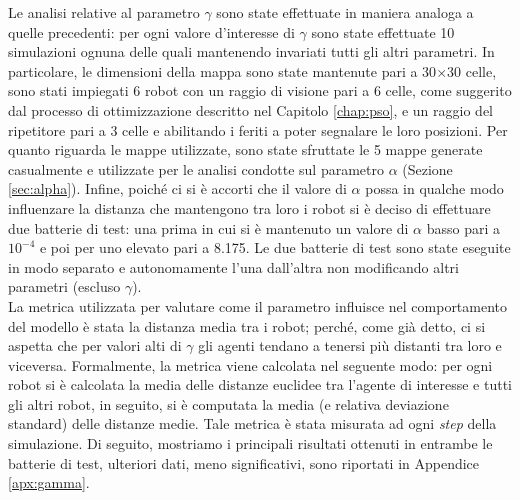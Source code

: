 Le analisi relative al parametro $\gamma$ sono state effettuate in maniera analoga a quelle precedenti: per ogni valore d'interesse di $\gamma$ sono state effettuate 10 simulazioni ognuna delle quali mantenendo invariati tutti gli altri parametri.
In particolare, le dimensioni della mappa sono state mantenute pari a 30$\times$30 celle, sono stati impiegati 6 robot con un raggio di visione pari a 6 celle, come suggerito dal processo di ottimizzazione descritto nel Capitolo \ref{chap:pso}, e un raggio del ripetitore pari a 3 celle e abilitando i feriti a poter segnalare le loro posizioni.
Per quanto riguarda le mappe utilizzate, sono state sfruttate le 5 mappe generate casualmente e utilizzate per le analisi condotte sul parametro $\alpha$ (Sezione \ref{sec:alpha}).
Infine, poiché ci si è accorti che il valore di $\alpha$ possa in qualche modo influenzare la distanza che mantengono tra loro i robot si è deciso di effettuare due batterie di test: una prima in cui si è mantenuto un valore di $\alpha$ basso pari a $10^{-4}$ e poi per uno elevato pari a 8.175.
Le due batterie di test sono state eseguite in modo separato e autonomamente l'una dall'altra non modificando altri parametri (escluso $\gamma$).\\
La metrica utilizzata per valutare come il parametro influisce nel comportamento del modello è stata la distanza media tra i robot; perché, come già detto, ci si aspetta che per valori alti di $\gamma$ gli agenti tendano a tenersi più distanti tra loro e viceversa.
Formalmente, la metrica viene calcolata nel seguente modo: per ogni robot si è calcolata la media delle distanze euclidee tra l'agente di interesse e tutti gli altri robot, in seguito, si è computata la media (e relativa deviazione standard) delle distanze medie.
Tale metrica è stata misurata ad ogni \textit{step} della simulazione.
Di seguito, mostriamo i principali risultati ottenuti in entrambe le batterie di test, ulteriori dati, meno significativi, sono riportati in Appendice \ref{apx:gamma}.

